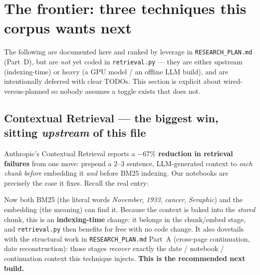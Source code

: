 \documentclass[11pt]{article}
\newcommand{\file}[1]{\texttt{#1}}
\begin{document}
\section{The frontier: three techniques this corpus wants next}

The following are documented here and ranked by leverage in \file{RESEARCH\_PLAN.md} (Part~D), but
are \emph{not} yet coded in \file{retrieval.py} --- they are either upstream (indexing-time) or heavy
(a GPU model / an offline LLM build), and are intentionally deferred with clear TODOs. This section
is explicit about wired-versus-planned so nobody assumes a toggle exists that does not.

\subsection{Contextual Retrieval --- the biggest win, sitting \emph{upstream} of this file}

Anthropic's Contextual Retrieval reports a \textbf{$-67\%$ reduction in retrieval failures} from one
move: prepend a 2--3 sentence, LLM-generated context to \emph{each chunk} \emph{before} embedding it
\emph{and} before BM25 indexing. Our notebooks are precisely the case it fixes. Recall the real
entry:
\begin{center}
\end{center}
Now both BM25 (the literal words \emph{November}, \emph{1933}, \emph{cancer}, \emph{Seraphic}) and
the embedding (the meaning) can find it. Because the context is baked into the \emph{stored} chunk,
this is an \textbf{indexing-time} change: it belongs in the chunk/embed stage, and
\file{retrieval.py} then benefits for free with no code change. It also dovetails with the structural
work in \file{RESEARCH\_PLAN.md} Part~A (cross-page continuation, date reconstruction): those stages
\emph{recover} exactly the date / notebook / continuation context this technique injects.
\textbf{This is the recommended next build.}
\end{document}
